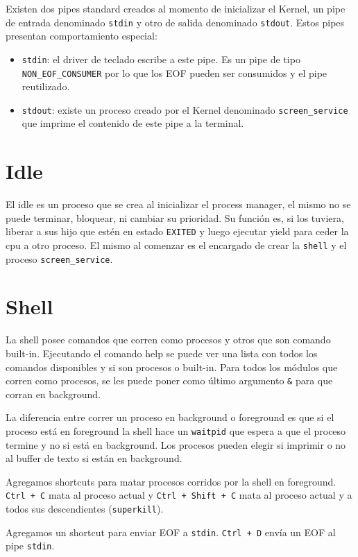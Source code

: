 \documentclass{article}
\begin{document}
Existen dos pipes standard creados al momento de inicializar el Kernel, un pipe de entrada  denominado \texttt{stdin} y otro de salida denominado \texttt{stdout}. Estos pipes presentan comportamiento especial:
\begin{itemize}
\item \texttt{stdin}: el driver de teclado escribe a este pipe. Es un pipe de tipo \texttt{NON\_EOF\_CONSUMER} por lo que los EOF pueden ser consumidos y el pipe reutilizado.
\item \texttt{stdout}: existe un proceso creado por el Kernel denominado \texttt{screen\_service} que imprime el contenido de este pipe a la terminal.
\end{itemize}

\section {Idle}
El idle es un proceso que se crea al inicializar el process manager, el mismo no se puede terminar, bloquear, ni cambiar su prioridad. Su función es, si los tuviera, liberar a sus hijo que estén en estado \texttt{EXITED} y luego ejecutar yield para ceder la cpu a otro proceso. El mismo al comenzar es el encargado de crear la \texttt{shell} y el proceso \texttt{screen\_service}.

\section {Shell}
La shell posee comandos que corren como procesos y otros que son comando built-in. Ejecutando el comando help se puede ver una lista con todos los comandos disponibles y si son procesos o built-in. Para todos los módulos que corren como procesos, se les puede poner como último argumento \texttt{\&} para que corran en background.

La diferencia entre correr un proceso en background o foreground es que si el proceso está en foreground la shell hace un \texttt{waitpid} que espera a que el proceso termine y no si está en background. Los procesos pueden elegir si imprimir o no al buffer de texto si están en background.

Agregamos shortcuts para matar procesos corridos por la shell en foreground. \texttt{Ctrl + C} mata al proceso actual y \texttt{Ctrl + Shift + C} mata al proceso actual y a todos sus descendientes (\texttt{superkill}).

Agregamos un shortcut para enviar EOF a \texttt{stdin}. \texttt{Ctrl + D} envía un EOF al pipe \texttt{stdin}.
\end{document}
